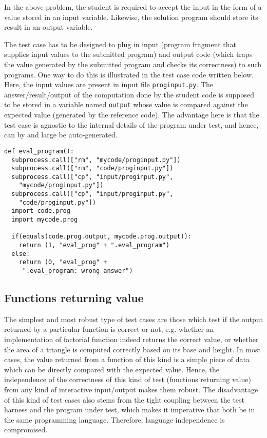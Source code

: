 \documentclass[12pt]{article}
\begin{document}
In the above problem, the student is required to accept the input in the form of a value stored in an input variable. Likewise, the solution program should store its result in an output variable.

The test case has to be designed to plug in input (program fragment that supplies input values to the submitted program) and output code (which traps the value generated by the submitted program and checks its correctness) to such programs. One way to do this is illustrated in the test case code written below. Here, the input values are present in input file \texttt{proginput.py}. The answer/result/output of the computation done by the student code is supposed to be stored in a variable named \lstinline[style=pc]|output| whose value is compared against the expected value (generated by the reference code). The advantage here is that the test case is agnostic to the internal details of the program under test, and hence, can by and large be auto-generated.

\begin{lstlisting}[style=pc]
def eval_program():
  subprocess.call(["rm", "mycode/proginput.py"])
  subprocess.call(["rm", "code/proginput.py"])
  subprocess.call(["cp", "input/proginput.py",
    "mycode/proginput.py"])
  subprocess.call(["cp", "input/proginput.py",
    "code/proginput.py"])
  import code.prog
  import mycode.prog

  if(equals(code.prog.output, mycode.prog.output)):
    return (1, "eval_prog" + ".eval_program")
  else:
    return (0, "eval_prog" +
     ".eval_program: wrong answer")
\end{lstlisting}


\subsection{Functions returning value}
The simplest and most robust type of test cases are those which test if the output returned by a particular function is correct or not, e.g. whether an implementation of factorial function indeed returns the correct value, or whether the area of a triangle is computed correctly based on its base and height. In most cases, the value returned from a function of this kind is a simple piece of data which can be directly compared with the expected value. Hence, the independence of the correctness of this kind of test (functions returning value) from any kind of interactive input/output makes them robust. The disadvantage of this kind of test cases also stems from the tight coupling between the test harness and the program under test, which makes it imperative that both be in the same programming language. Therefore, language independence is compromised.
\end{document}

